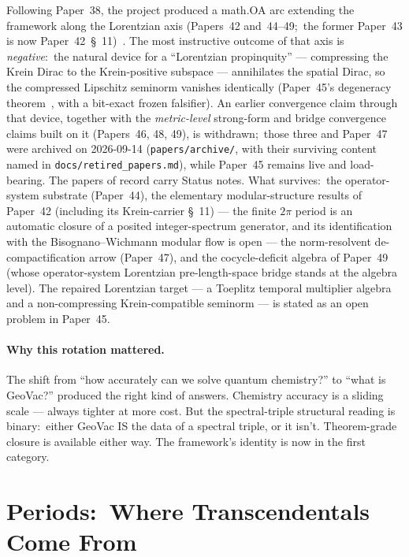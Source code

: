 \documentclass[11pt,a4paper]{article}
\begin{document}
Following Paper~38, the project produced a math.OA arc extending the
framework along the Lorentzian axis (Papers~42 and~44--49;\ the
former Paper~43 is now Paper~42~\S~11)~\cite{loutey_paper42, loutey_paper44,
loutey_paper45, loutey_paper46, loutey_paper47, loutey_paper48,
loutey_paper49}.  The most instructive outcome of that axis is
\emph{negative}:\ the natural device for a ``Lorentzian propinquity''
--- compressing the Krein Dirac to the Krein-positive subspace ---
annihilates the spatial Dirac, so the compressed Lipschitz seminorm
vanishes identically (Paper~45's degeneracy
theorem~\cite{loutey_paper45}, with a bit-exact frozen falsifier).
An earlier convergence claim through that device, together with the
\emph{metric-level} strong-form and bridge convergence claims built on
it (Papers~46, 48, 49), is withdrawn;\ those three and Paper~47 were
archived on 2026-09-14 (\texttt{papers/archive/}, with their surviving
content named in \texttt{docs/retired\_papers.md}), while Paper~45 remains
live and load-bearing.  The papers of record carry
Status notes.  What
survives:\ the operator-system substrate (Paper~44), the elementary
modular-structure results of Paper~42 (including its Krein-carrier
\S~11) --- the finite $2\pi$ period is an automatic closure of a
posited integer-spectrum generator, and its identification with the
Bisognano--Wichmann modular flow is open --- the norm-resolvent
de-compactification arrow (Paper~47), and the cocycle-deficit algebra
of Paper~49 (whose operator-system Lorentzian pre-length-space bridge
stands at the algebra level).  The repaired Lorentzian target --- a Toeplitz temporal
multiplier algebra and a non-compressing Krein-compatible seminorm
--- is stated as an open problem in Paper~45.

\paragraph{Why this rotation mattered.}
The shift from ``how accurately can we solve quantum chemistry?'' to
``what is GeoVac?'' produced the right kind of answers.  Chemistry
accuracy is a sliding scale --- always tighter at more cost.  But
the spectral-triple structural reading is binary:\ either GeoVac IS
the data of a spectral triple, or it isn't.  Theorem-grade closure
is available either way.  The framework's identity is now in the
first category.

\section{Periods:\ Where Transcendentals Come From}
\label{sec:periods}
\end{document}
